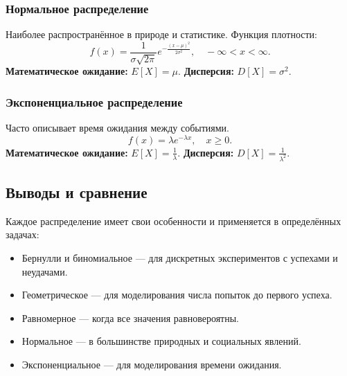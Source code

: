 \subsubsection{Нормальное распределение}
Наиболее распространённое в природе и статистике.  
Функция плотности:
\[
f(x) = \frac{1}{\sigma \sqrt{2\pi}} e^{-\frac{(x-\mu)^2}{2\sigma^2}}, \quad -\infty < x < \infty.
\]
\textbf{Математическое ожидание:} $E[X] = \mu$.  
\textbf{Дисперсия:} $D[X] = \sigma^2$.

\begin{center}
\end{center}

\subsubsection{Экспоненциальное распределение}
Часто описывает время ожидания между событиями.
\[
f(x) = \lambda e^{-\lambda x}, \quad x \geq 0.
\]
\textbf{Математическое ожидание:} $E[X] = \frac{1}{\lambda}$.  
\textbf{Дисперсия:} $D[X] = \frac{1}{\lambda^2}$.

\begin{center}
\end{center}

\subsection{Выводы и сравнение}
Каждое распределение имеет свои особенности и применяется в определённых задачах:
\begin{itemize}
    \item Бернулли и биномиальное --- для дискретных экспериментов с успехами и неудачами.
    \item Геометрическое --- для моделирования числа попыток до первого успеха.
    \item Равномерное --- когда все значения равновероятны.
    \item Нормальное --- в большинстве природных и социальных явлений.
    \item Экспоненциальное --- для моделирования времени ожидания.
\end{itemize}
